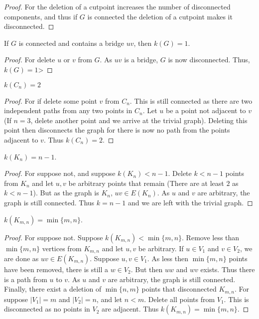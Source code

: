 \documentclass[crop=false,class=book]{standalone}
\begin{document}
\begin{proof}
For the deletion of a cutpoint increases the number of disconnected components, and thus if $G$ is connected the deletion of a cutpoint makes it disconnected.
\end{proof}
\begin{corollary}
If $G$ is connected and contains a bridge $uv$, then $k(G)=1$.
\end{corollary}
\begin{proof}
For delete $u$ or $v$ from $G$. As $uv$ is a bridge, $G$ is now disconnected. Thus, $k(G) = 1$>
\end{proof}
\begin{corollary}
$k(C_n) =2$
\end{corollary}
\begin{proof}
For if delete some point $v$ from $C_n$. This is still connected as there are two independent paths from any two points in $C_n$. Let $u$ be a point not adjacent to $v$ (If $n=3$, delete another point and we arrive at the trivial graph). Deleting this point then disconnects the graph for there is now no path from the points adjacent to $v$. Thus $k(C_n)=2$.
\end{proof}
\begin{corollary}
$k(K_n) = n-1$.
\end{corollary}
\begin{proof}
For suppose not, and suppose $k(K_n)<n-1$. Delete $k<n-1$ points from $K_n$ and let $u,v$ be arbitrary points that remain (There are at least $2$ as $k<n-1$). But as the graph is $K_n$, $uv\in E(K_n)$. As $u$ and $v$ are arbitrary, the graph is still connected. Thus $k=n-1$ and we are left with the trivial graph.
\end{proof}
\begin{corollary}
$k(K_{m,n}) = \min\{m,n\}$.
\end{corollary}
\begin{proof}
For suppose not. Suppose $k(K_{m,n})<\min\{m,n\}$. Remove less than $\min\{m,n\}$ vertices from $K_{m,n}$ and let $u,v$ be arbitrary. If $u\in V_1$ and $v\in V_2$, we are done as $uv\in E(K_{m,n})$. Suppose $u,v\in V_1$. As less then $\min\{m,n\}$ points have been removed, there is still a $w\in V_2$. But then $uw$ and $wv$ exists. Thus there is a path from $u$ to $v$. As $u$ and $v$ are arbitrary, the graph is still connected. Finally, there exist a deletion of $\min\{n,m\}$ points that disconnected $K_{m,n}$. For suppose $|V_1| = m$ and $|V_2| = n$, and let $n<m$. Delete all points from $V_1$. This is disconnected as no points in $V_2$ are adjacent. Thus $k(K_{m,n})=\min\{m,n\}$.
\end{proof}
\end{document}
